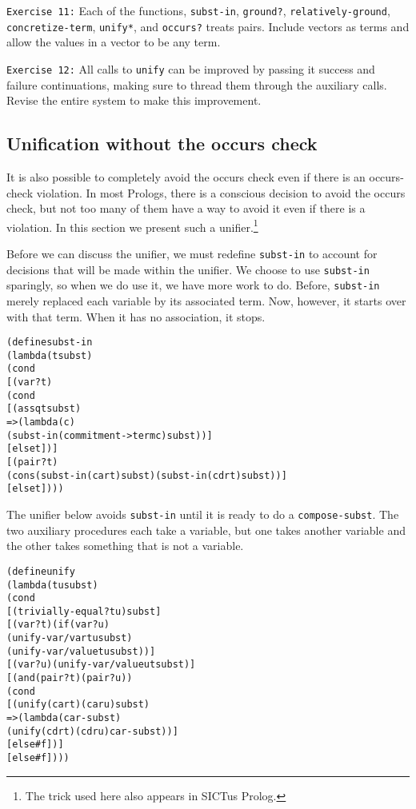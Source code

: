 \noindent
\texttt{Exercise 11:} Each of the functions, \texttt{subst-in},
\texttt{ground?}, \texttt{relatively-ground},
\texttt{concretize-term}, \texttt{unify*}, and \texttt{occurs?}
treats pairs.  Include vectors as terms and allow the values in a
vector to be any term.\endofexercise

\noindent
\texttt{Exercise 12:} All calls to \texttt{unify} can be improved by
passing it success and failure continuations, making sure to thread
them through the auxiliary calls.  Revise the entire system to make
this improvement.\endofexercise

\subsection{Unification without the occurs check}

It is also possible to completely avoid the occurs check even if
there is an occurs-check violation.  In most Prologs, there is a
conscious decision to avoid the occurs check, but not too many of
them have a way to avoid it even if there is a violation. In
this section we present such a unifier.\footnote{The trick used here
also appears in SICTus Prolog.}

Before we can discuss the unifier, we must redefine \texttt{subst-in}
to account for decisions that will be made within the unifier.  We
choose to use \texttt{subst-in} sparingly, so when we do use it, we
have more work to do.  Before, \texttt{subst-in} merely replaced each
variable by its associated term.  Now, however, it starts over
with that term.  When it has no association, it stops.
\begin{alltt}
(define subst-in
  (lambda (t subst)
    (cond
      [(var? t)
       (cond
         [(assq t subst)
          => (lambda (c)
               (subst-in (commitment->term c) subst))]
         [else t])]
      [(pair? t)
       (cons (subst-in (car t) subst) (subst-in (cdr t) subst))]
      [else t])))
\end{alltt}

The unifier below avoids \texttt{subst-in} until it is ready to do a
\texttt{compose-subst}.  The two auxiliary procedures each take a
variable, but one takes another variable and the other takes something
that is not a variable.

\begin{alltt}
(define unify
  (lambda (t u subst)
    (cond
      [(trivially-equal? t u) subst]
      [(var? t) (if (var? u)
                    (unify-var/var t u subst)
                    (unify-var/value t u subst))]
      [(var? u) (unify-var/value u t subst)]
      [(and (pair? t) (pair? u))
       (cond
         [(unify (car t) (car u) subst)
          => (lambda (car-subst)
               (unify (cdr t) (cdr u) car-subst))]
         [else #f])]
      [else #f])))
\end{alltt}

